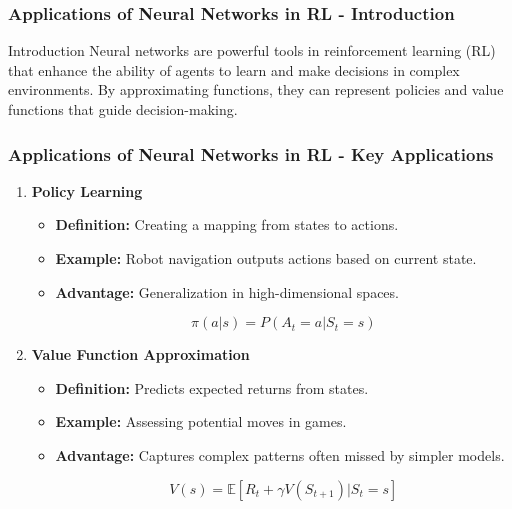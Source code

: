 \documentclass[aspectratio=169]{beamer}
\begin{document}
\begin{frame}[fragile]
    \frametitle{Applications of Neural Networks in RL - Introduction}
    \begin{block}{Introduction}
        Neural networks are powerful tools in reinforcement learning (RL) that enhance the ability of agents to learn and make decisions in complex environments.
        By approximating functions, they can represent policies and value functions that guide decision-making.
    \end{block}
\end{frame}

\begin{frame}[fragile]
    \frametitle{Applications of Neural Networks in RL - Key Applications}
    \begin{enumerate}
        \item \textbf{Policy Learning}
            \begin{itemize}
                \item \textbf{Definition:} Creating a mapping from states to actions.
                \item \textbf{Example:} Robot navigation outputs actions based on current state.
                \item \textbf{Advantage:} Generalization in high-dimensional spaces.
                
                \begin{equation}
                    \pi(a|s) = P(A_t = a | S_t = s) 
                \end{equation}
            \end{itemize}

        \item \textbf{Value Function Approximation}
            \begin{itemize}
                \item \textbf{Definition:} Predicts expected returns from states.
                \item \textbf{Example:} Assessing potential moves in games.
                \item \textbf{Advantage:} Captures complex patterns often missed by simpler models.
                
                \begin{equation}
                    V(s) = \mathbb{E}[R_t + \gamma V(S_{t+1}) | S_t = s]
                \end{equation}
            \end{itemize}
    \end{enumerate}
\end{frame}
\end{document}
